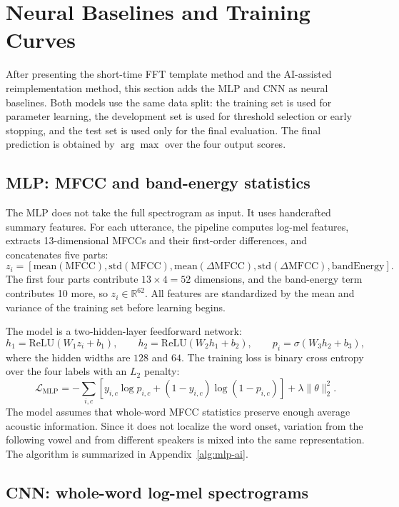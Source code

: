 \section{Neural Baselines and Training Curves}

After presenting the short-time FFT template method and the AI-assisted reimplementation method, this section adds the MLP and CNN as neural baselines. Both models use the same data split: the training set is used for parameter learning, the development set is used for threshold selection or early stopping, and the test set is used only for the final evaluation. The final prediction is obtained by $\arg\max$ over the four output scores.

\subsection{MLP: MFCC and band-energy statistics}

The MLP does not take the full spectrogram as input. It uses handcrafted summary features. For each utterance, the pipeline computes log-mel features, extracts 13-dimensional MFCCs and their first-order differences, and concatenates five parts:
\[
z_i=
\left[
\mathrm{mean}(\mathrm{MFCC}),
\mathrm{std}(\mathrm{MFCC}),
\mathrm{mean}(\Delta\mathrm{MFCC}),
\mathrm{std}(\Delta\mathrm{MFCC}),
\mathrm{bandEnergy}
\right].
\]
The first four parts contribute $13\times4=52$ dimensions, and the band-energy term contributes 10 more, so $z_i\in\mathbb{R}^{62}$. All features are standardized by the mean and variance of the training set before learning begins.

The model is a two-hidden-layer feedforward network:
\[
h_1=\mathrm{ReLU}(W_1z_i+b_1),\qquad
h_2=\mathrm{ReLU}(W_2h_1+b_2),\qquad
p_i=\sigma(W_3h_2+b_3),
\]
where the hidden widths are $128$ and $64$. The training loss is binary cross entropy over the four labels with an $L_2$ penalty:
\[
\mathcal{L}_{\mathrm{MLP}}
=-\sum_{i,c}\left[y_{i,c}\log p_{i,c}+(1-y_{i,c})\log(1-p_{i,c})\right]
+\lambda\|\theta\|_2^2.
\]
The model assumes that whole-word MFCC statistics preserve enough average acoustic information. Since it does not localize the word onset, variation from the following vowel and from different speakers is mixed into the same representation. The algorithm is summarized in Appendix~\ref{alg:mlp-ai}.

\subsection{CNN: whole-word log-mel spectrograms}

